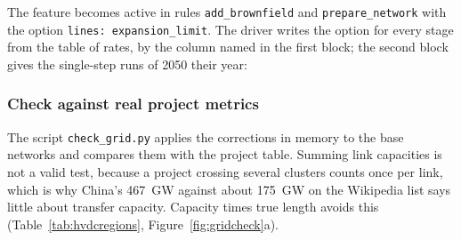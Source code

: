 \begin{table}[htb]
  \centering
  \caption{The cap on grid build-out: rate per year and the grid it allows relative to 2024.
  Delivered: US about 1\,\% per year in the last decade and 2\,\% from 1978 to 2020 \citep{repeat2022}; EU $+12$\,\% in a decade, Brazil more than $+50$\,\%, India about $+60$\,\% \citep{ieagrids2023}; India $+3$\,\% per year from 2019-20 to 2024-25 \citep{powerline2025}; China's west-to-east capacity from 270 to \SI{340}{GW} between 2020 and 2025.
  Plans: US 2.1 to 2.6 times the system of 2020 by 2050 \citep{gridstrategies2025}; cross-border capacity between the twelve European countries from 46.6 to \SI{71.3}{GW} by 2030 \citep{emberinterconnection}; Brazil 191,353 to \SI{220134}{km} by 2035 \citep{epepde2035}; India 496,372 to 648,190 circuit km by 2031-32 \citep{powerline2025}; China \SI{420}{GW} by 2030.}
  \label{tab:gridexpansion}
  \small
  
\end{table}

The feature becomes active in rules \texttt{add\_brownfield} and \texttt{prepare\_network} with the option \texttt{lines: expansion\_limit}.
The driver writes the option for every stage from the table of rates, by the column named in the first block; the second block gives the single-step runs of 2050 their year:


\FloatBarrier
\subsubsection{Check against real project metrics}\label{sec:grid-check}

The script \texttt{check\_grid.py} applies the corrections in memory to the base networks and compares them with the project table.
Summing link capacities is not a valid test, because a project crossing several clusters counts once per link, which is why China's \SI{467}{GW} against about \SI{175}{GW} on the Wikipedia list says little about transfer capacity.
Capacity times true length avoids this (Table~\ref{tab:hvdcregions}, Figure~\ref{fig:gridcheck}a).

